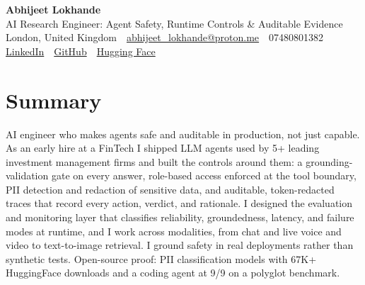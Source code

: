 \documentclass[10pt,a4paper]{article}
\newcommand{\sep}{\,\textcolor{accent!60}{\textbar}\,}
\begin{document}
\begin{center}
  {\fontsize{24}{26}\selectfont\bfseries Abhijeet Lokhande}\\[3pt]
  {\color{accent}\large AI Research Engineer: Agent Safety, Runtime Controls \& Auditable Evidence}\\[5pt]
  {\small
    London, United Kingdom \sep
    \href{mailto:abhijeet_lokhande@proton.me}{abhijeet\_lokhande@proton.me} \sep
    07480801382 \\[2pt]
    \href{https://www.linkedin.com/in/ablds/}{LinkedIn} \sep
    \href{https://github.com/abhijeetscode}{GitHub} \sep
    \href{https://huggingface.co/ab-ai}{Hugging Face}
  }
\end{center}
\vspace{2pt}

\section{Summary}
AI engineer who makes agents safe and auditable in production, not just capable. As an early hire at a FinTech I shipped LLM agents used by 5+ leading investment management firms and built the controls around them: a grounding-validation gate on every answer, role-based access enforced at the tool boundary, PII detection and redaction of sensitive data, and auditable, token-redacted traces that record every action, verdict, and rationale. I designed the evaluation and monitoring layer that classifies reliability, groundedness, latency, and failure modes at runtime, and I work across modalities, from chat and live voice and video to text-to-image retrieval. I ground safety in real deployments rather than synthetic tests. Open-source proof: PII classification models with 67K+ HuggingFace downloads and a coding agent at 9/9 on a polyglot benchmark.

\end{document}
